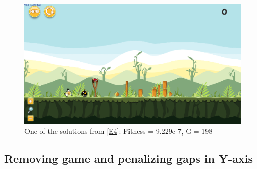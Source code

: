 \documentclass[sigconf]{acmart}
\begin{document}
\begin{figure}
	\centering
	\includegraphics[scale=0.2]{level-0-second_crossover_min10_180602_035405.png}
	\caption{One of the solutions from \ref{E4}: Fitness = 9.229e-7, G = 198 
	}\label{f:e4-1}
\end{figure}

\subsection{Removing game and penalizing gaps in Y-axis}\label{E5}
\end{document}
